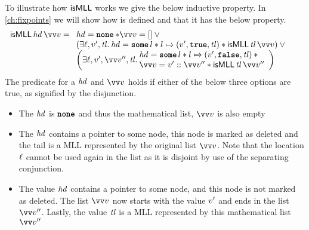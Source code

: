 \documentclass[thesis.tex]{subfiles}
\begin{document}
To illustrate how $\textsf{\upshape isMLL}$ works we give the below inductive property. In \cref{ch:fixpoints} we will show how \isMLL is defined and that it has the below property.
\begin{align*}
    \isMLL\, \hd\, \vect{\val} & =
    \isMLLRecDef
\end{align*}
The predicate \isMLL for a $\mathit{hd}$ and $\vect{\val}$ holds if either of the below three options are true, as signified by the disjunction.
\begin{itemize}
    \item The $\mathit{hd}$ is $\operatorname{\texttt{\upshape \bfseries none}}$ and thus the mathematical list, $\vect{\val}$ is also empty
    \item The $\mathit{hd}$ contains a pointer to some node, this node is marked as deleted and the tail is a MLL represented by the original list $\vect{\val}$. Note that the location $\ell$ cannot be used again in the list as it is disjoint by use of the separating conjunction.
    \item The value $\mathit{hd}$ contains a pointer to some node, and this node is not marked as deleted. The list $\vect{\val}$ now starts with the value $v'$ and ends in the list $\vect{\val}''$. Lastly, the value $\mathit{tl}$ is a MLL represented by this mathematical list $\vect{\val}''$
\end{itemize}
\end{document}
